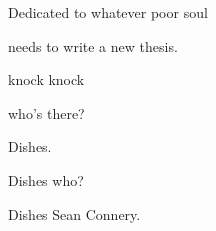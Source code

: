 \cleardoublepage

\thispagestyle{empty}
\vspace*{7cm}


\begin{center}
    Dedicated to whatever poor soul 

    needs to write a new thesis.
\end{center}

\cleardoublepage

\thispagestyle{empty}

knock knock

who's there?

Dishes.

Dishes who?

Dishes Sean Connery.

